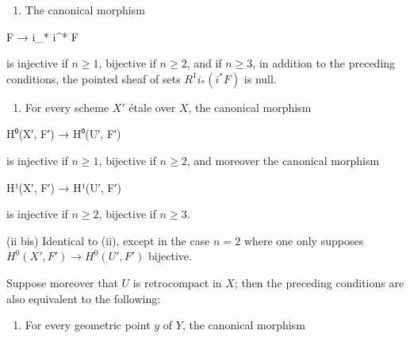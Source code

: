 \documentclass[
  11pt,
  a4paper,
]{book}
\newenvironment{Shaded}{}{}
\newcommand{\NormalTok}[1]{#1}
\providecommand{\tightlist}{%
  \setlength{\itemsep}{0pt}\setlength{\parskip}{0pt}}
\begin{document}
\begin{enumerate}
\def\labelenumi{(\roman{enumi})}
\tightlist
\item
  The canonical morphism
\end{enumerate}

\begin{Shaded}
\begin{Highlighting}[]
\NormalTok{F → i\_* i\^{}* F}
\end{Highlighting}
\end{Shaded}

is injective if \(n \geqslant 1\), bijective if \(n \geqslant 2\), and
if \(n \geqslant 3\), in addition to the preceding conditions, the
pointed sheaf of sets \(R^{1} i_{*} (i^{*} F)\) is null.

\begin{enumerate}
\def\labelenumi{(\roman{enumi})}
\setcounter{enumi}{1}
\tightlist
\item
  For every scheme \(X'\) étale over \(X\), the canonical morphism
\end{enumerate}

\begin{Shaded}
\begin{Highlighting}[]
\NormalTok{H⁰(X′, F′) → H⁰(U′, F′)}
\end{Highlighting}
\end{Shaded}

is injective if \(n \geqslant 1\), bijective if \(n \geqslant 2\), and
moreover the canonical morphism

\begin{Shaded}
\begin{Highlighting}[]
\NormalTok{H¹(X′, F′) → H¹(U′, F′)}
\end{Highlighting}
\end{Shaded}

is injective if \(n \geqslant 2\), bijective if \(n \geqslant 3\).

(ii bis) Identical to (ii), except in the case \(n = 2\) where one only
supposes \(H^{0}(X', F') \to H^{0}(U', F')\) bijective.

Suppose moreover that \(U\) is retrocompact in \(X\); then the preceding
conditions are also equivalent to the following:

\begin{enumerate}
\def\labelenumi{(\roman{enumi})}
\setcounter{enumi}{2}
\tightlist
\item
  For every geometric point \(y\) of \(Y\), the canonical morphism
\end{enumerate}
\end{document}
